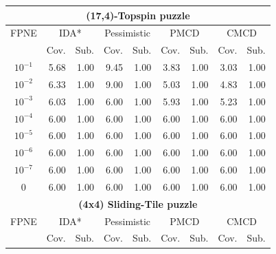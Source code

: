\documentclass{article}
\begin{document}
\begin{table}[t]
\begin{tabular}{| c | r  r | r  r | r  r | r  r |}
\hline
\hline
\multicolumn{9}{|c|}{\textbf{(17,4)-Topspin puzzle}} \\
\hline
FPNE     & \multicolumn{2}{|c|}{IDA*}    & \multicolumn{2}{|c|}{Pessimistic}     & \multicolumn{2}{|c|}{PMCD}    & \multicolumn{2}{|c|}{CMCD}    \\
\hline
        & \multicolumn{1}{c}{Cov.} & \multicolumn{1}{c|}{Sub.}  & \multicolumn{1}{c}{Cov.} & \multicolumn{1}{c|}{Sub.}  & \multicolumn{1}{c}{Cov.} & \multicolumn{1}{c|}{Sub.}  & \multicolumn{1}{c}{Cov.} & \multicolumn{1}{c|}{Sub.}  \\
\hline
$10^{-1}$        & 5.68  & 1.00  & 9.45         & 1.00         & 3.83  & 1.00  & 3.03  & 1.00 \\
$10^{-2}$        & 6.33  & 1.00  & 9.00         & 1.00         & 5.03  & 1.00  & 4.83  & 1.00 \\
$10^{-3}$        & 6.03  & 1.00  & 6.00  & 1.00  & 5.93  & 1.00  & 5.23  & 1.00 \\
$10^{-4}$        & 6.00  & 1.00  & 6.00         & 1.00         & 6.00         & 1.00         & 6.00         & 1.00        \\
$10^{-5}$        & 6.00  & 1.00  & 6.00         & 1.00         & 6.00         & 1.00         & 6.00         & 1.00        \\
$10^{-6}$	 & 6.00	 & 1.00	 & 6.00	 & 1.00	 & 6.00	 & 1.00	 & 6.00	 & 1.00	\\
$10^{-7}$	 & 6.00	 & 1.00	 & 6.00	 & 1.00	 & 6.00	 & 1.00	 & 6.00	 & 1.00	\\
0        & 6.00  & 1.00          & 6.00         & 1.00         & 6.00         & 1.00         & 6.00         & 1.00        \\
\hline
\hline
\multicolumn{9}{|c|}{\textbf{(4x4) Sliding-Tile puzzle}} \\
\hline
FPNE     & \multicolumn{2}{|c|}{IDA*}    & \multicolumn{2}{|c|}{Pessimistic}     & \multicolumn{2}{|c|}{PMCD}    & \multicolumn{2}{|c|}{CMCD}    \\
\hline
        & \multicolumn{1}{c}{Cov.} & \multicolumn{1}{c|}{Sub.}  & \multicolumn{1}{c}{Cov.} & \multicolumn{1}{c|}{Sub.}  & \multicolumn{1}{c}{Cov.} & \multicolumn{1}{c|}{Sub.}  & \multicolumn{1}{c}{Cov.} & \multicolumn{1}{c|}{Sub.}  \\
\hline

\end{tabular}
\end{table}
\end{document}
